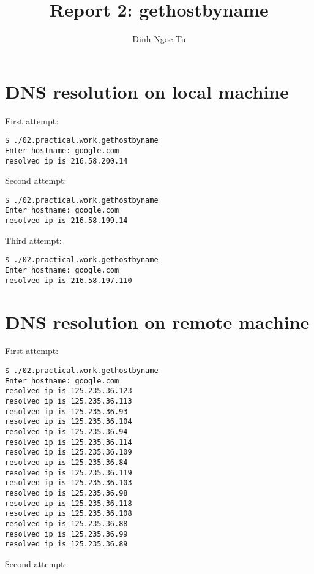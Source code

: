 \documentclass[12pt]{article}
\title{Report 2: gethostbyname}
\author{Dinh Ngoc Tu}
\begin{document}
\maketitle


\section{DNS resolution on local machine}

First attempt:

\begin{lstlisting}[breaklines]
$ ./02.practical.work.gethostbyname
Enter hostname: google.com
resolved ip is 216.58.200.14
\end{lstlisting}

Second attempt:

\begin{lstlisting}[breaklines]
$ ./02.practical.work.gethostbyname
Enter hostname: google.com
resolved ip is 216.58.199.14
\end{lstlisting}

Third attempt:

\begin{lstlisting}[breaklines]
$ ./02.practical.work.gethostbyname
Enter hostname: google.com
resolved ip is 216.58.197.110
\end{lstlisting}


\section{DNS resolution on remote machine}

First attempt:

\begin{lstlisting}[breaklines]
$ ./02.practical.work.gethostbyname
Enter hostname: google.com
resolved ip is 125.235.36.123
resolved ip is 125.235.36.113
resolved ip is 125.235.36.93
resolved ip is 125.235.36.104
resolved ip is 125.235.36.94
resolved ip is 125.235.36.114
resolved ip is 125.235.36.109
resolved ip is 125.235.36.84
resolved ip is 125.235.36.119
resolved ip is 125.235.36.103
resolved ip is 125.235.36.98
resolved ip is 125.235.36.118
resolved ip is 125.235.36.108
resolved ip is 125.235.36.88
resolved ip is 125.235.36.99
resolved ip is 125.235.36.89
\end{lstlisting}

Second attempt:
\end{document}
